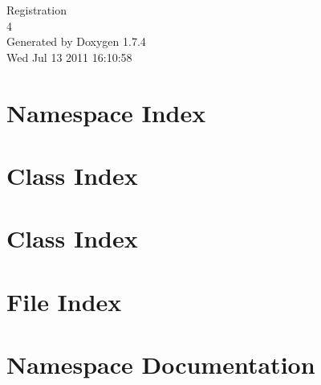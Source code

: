 \documentclass[a4paper]{book}
\begin{document}
\hypersetup{pageanchor=false}
\begin{titlepage}
\vspace*{7cm}
\begin{center}
{\Large Registration \\[1ex]\large 4 }\\
\vspace*{1cm}
{\large Generated by Doxygen 1.7.4}\\
\vspace*{0.5cm}
{\small Wed Jul 13 2011 16:10:58}\\
\end{center}
\end{titlepage}
\clearemptydoublepage
{}
\tableofcontents
\clearemptydoublepage
{}
\hypersetup{pageanchor=true}
\chapter{Namespace Index}

\chapter{Class Index}

\chapter{Class Index}

\chapter{File Index}

\chapter{Namespace Documentation}



















\end{document}
